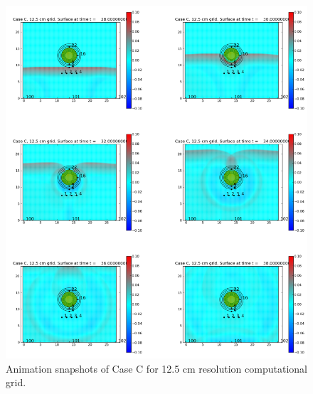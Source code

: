 \begin{figure}[ht]
\hfil\includegraphics[width=7in]{bp6/C12-5Movie.png}\hfil
\caption{\label{C12-5Movie}
Animation snapshots of Case C for 12.5 cm resolution computational grid.
  }
\end{figure}

